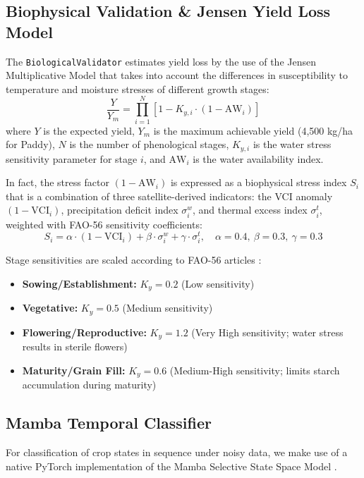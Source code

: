 \documentclass[conference]{IEEEtran}
\begin{document}
\subsection{Biophysical Validation \& Jensen Yield Loss Model}
The \texttt{BiologicalValidator} estimates yield loss by the use of the Jensen Multiplicative Model \cite{b5} that takes into account the differences in susceptibility to temperature and moisture stresses of different growth stages:
\begin{equation}
\frac{Y}{Y_m} = \prod_{i=1}^{N} \left[1 - K_{y,i} \cdot (1 - \text{AW}_i)\right]
\end{equation}
where $Y$ is the expected yield, $Y_m$ is the maximum achievable yield (4,500 kg/ha for Paddy), $N$ is the number of phenological stages, $K_{y,i}$ is the water stress sensitivity parameter for stage $i$, and $\text{AW}_i$ is the water availability index.

In fact, the stress factor $(1 - \text{AW}_i)$ is expressed as a biophysical stress index $S_i$ that is a combination of three satellite-derived indicators: the VCI anomaly $(1 - \text{VCI}_i)$, precipitation deficit index $\sigma^w_i$, and thermal excess index $\sigma^t_i$, weighted with FAO-56 sensitivity coefficients:
\begin{equation}
S_i = \alpha \cdot (1 - \text{VCI}_i) + \beta \cdot \sigma^w_i + \gamma \cdot \sigma^t_i, \quad \alpha{=}0.4,\ \beta{=}0.3,\ \gamma{=}0.3
\end{equation}

Stage sensitivities are scaled according to FAO-56 articles \cite{b4}:
\begin{itemize}
\item \textbf{Sowing/Establishment:} $K_y = 0.2$ (Low sensitivity)
\item \textbf{Vegetative:} $K_y = 0.5$ (Medium sensitivity)
\item \textbf{Flowering/Reproductive:} $K_y = 1.2$ (Very High sensitivity; water stress results in sterile flowers)
\item \textbf{Maturity/Grain Fill:} $K_y = 0.6$ (Medium-High sensitivity; limits starch accumulation during maturity)
\end{itemize}

\subsection{Mamba Temporal Classifier}
For classification of crop states in sequence under noisy data, we make use of a native PyTorch implementation of the Mamba Selective State Space Model \cite{b3}.
\end{document}
